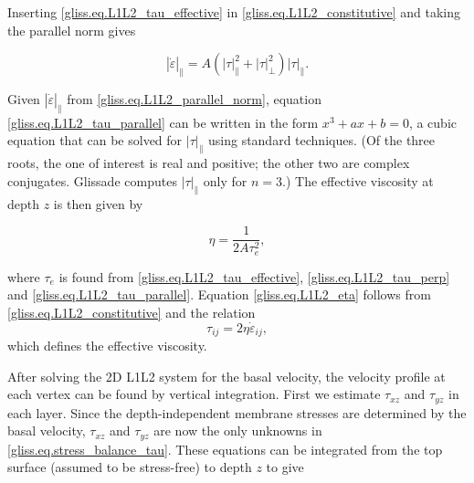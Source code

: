 {\noindent
Inserting \eqref{gliss.eq.L1L2_tau_effective} in \eqref{gliss.eq.L1L2_constitutive} and taking 
the parallel norm gives

\begin{equation}
  \label{gliss.eq.L1L2_tau_parallel}
        {\left| {\dot{\varepsilon }} \right|}_{\parallel}
        = A (\left| \tau \right|_{\parallel}^{2} + \left| \tau \right|_{\perp}^{2}) {{\left| \tau \right|}_{\parallel}}.
\end{equation}

\noindent
Given ${\left| {\dot{\varepsilon }} \right|}_{\parallel}$ from \eqref{gliss.eq.L1L2_parallel_norm},
equation \eqref{gliss.eq.L1L2_tau_parallel} can be written in the form $x^3 + a x + b = 0$,
a cubic equation that can be solved for ${\left| \tau \right|}_{\parallel}$ using standard techniques.
(Of the three roots, the one of interest is real and positive; the other two are complex conjugates.
Glissade computes ${\left| \tau \right|}_{\parallel}$ only for $n = 3$.)
The effective viscosity at depth $z$ is then given by

\begin{equation}
  \label{gliss.eq.L1L2_eta}
  \eta  = \frac{1}{2A \tau_{e}^{2}},
\end{equation}

\noindent
where $\tau_{e}$ is found from \eqref{gliss.eq.L1L2_tau_effective},
\eqref{gliss.eq.L1L2_tau_perp} and \eqref{gliss.eq.L1L2_tau_parallel}.
Equation \eqref{gliss.eq.L1L2_eta} follows from \eqref{gliss.eq.L1L2_constitutive}
and the relation 
\begin{equation}
  \label{gliss.eq.L1L2_eta2}
  {\tau_{ij}} = 2\eta {\dot{\varepsilon}_{ij}},
\end{equation} 
which defines the effective viscosity.

After solving the 2D L1L2 system for the basal velocity, the velocity profile at each vertex
can be found by vertical integration. First we estimate
$\tau_{xz}$ and $\tau_{yz}$ in each layer.  Since the depth-independent membrane stresses
are determined by the basal velocity, $\tau_{xz}$ and $\tau_{yz}$ are now the
only unknowns in \eqref{gliss.eq.stress_balance_tau}.  These equations can be integrated
from the top surface (assumed to be stress-free) to depth $z$ to give

}
